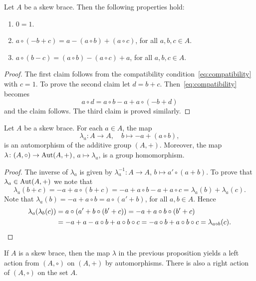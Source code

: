 \begin{lemma}
    \label{lem:basic}
	Let $A$ be a skew brace. Then the following properties hold:
    \begin{enumerate}
        \item $0=1$.  
        \item $a\circ(-b+c)=a-(a\circ b)+(a\circ c)$, for all $a,b,c\in A$.
        \item $a\circ(b-c)=(a\circ b)-(a\circ c)+a$, for all $a,b,c\in A$.
    \end{enumerate}
\end{lemma}

\begin{proof}
		The first claim follows from the compatibility condition~\eqref{eq:compatibility} with
		$c=1$.  To prove the second claim let $d=b+c$.
		Then~\eqref{eq:compatibility} becomes 
		\[
		a\circ d =a\circ b-a+a\circ (-b+d)
		\]
		and the claim follows. The third claim is
		proved similarly.
\end{proof}

\begin{proposition}
\label{pro:lambda}
    Let $A$ be a skew brace. For each $a\in A$, the map
    \[
        \lambda_a\colon A\to A,\quad
        b\mapsto -a+(a\circ b),
    \]
    is an automorphism of the additive group $(A,+)$. Moreover, the map 
    $\lambda\colon (A,\circ)\to\operatorname{Aut}(A,+)$, $a\mapsto\lambda_a$, is a group homomorphism. 
\end{proposition}

\begin{proof}
The inverse of $\lambda_a$ is given by $\lambda^{-1}_a\colon A\to A$, $b\mapsto a'\circ (a+b)$. To prove
that $\lambda_a\in\operatorname{Aut}(A,+)$ we note that
\[
\lambda_a(b+c)=-a+a\circ(b+c)=-a+a\circ b-a+a\circ c=\lambda_a(b)+\lambda_a(c).
\]
Note that $\lambda_a(b)=-a+a\circ b=a\circ (a'+b)$, for all $a,b\in A$. Hence 
\begin{align*}
\lambda_a(\lambda_b(c))&=a\circ (a'+b\circ (b'+c))=-a+a\circ b\circ (b'+c)\\
&=-a+a-a\circ b+a\circ b\circ c=-a\circ b+a\circ b\circ c=\lambda_{a\circ b}(c).\qedhere    
\end{align*}
\end{proof}

If $A$ is a skew brace, then 
the map $\lambda$ in the previous proposition yields a left action from $(A,\circ)$ on $(A,+)$ by automorphisms. 
There is also a right action of $(A,\circ)$ on the set $A$.

